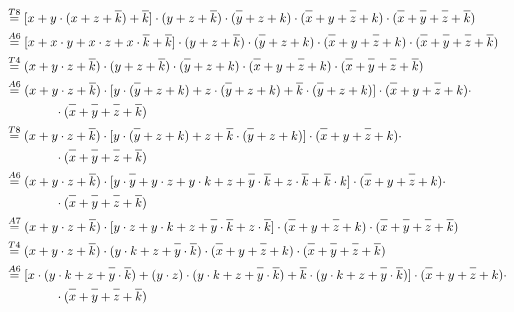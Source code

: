 \documentclass{article}
\newcommand*{\oline}[1]{\overline{#1\mathstrut}}
\newcommand{\bigspace}{\quad\quad\quad\quad}
\begin{document}
\begin{align*}
  &\overset{T8}{=} [x + y \cdot (x+z+\oline{k}) + \oline{k}] \cdot (y+z+\oline{k}) \cdot (\oline{y}+z+k) \cdot (\oline{x}+y+\oline{z}+k) \cdot (\oline{x}+\oline{y}+\oline{z}+\oline{k})\\
  &\overset{A6}{=} [x + x \cdot y + x \cdot z + x \cdot \oline{k} + \oline{k}] \cdot (y+z+\oline{k}) \cdot (\oline{y}+z+k) \cdot (\oline{x}+y+\oline{z}+k) \cdot (\oline{x}+\oline{y}+\oline{z}+\oline{k})\\
  &\overset{T4}{=} (x + y \cdot z + \oline{k}) \cdot (y+z+\oline{k}) \cdot (\oline{y}+z+k) \cdot (\oline{x}+y+\oline{z}+k) \cdot (\oline{x}+\oline{y}+\oline{z}+\oline{k})\\
  &\overset{A6}{=} (x + y \cdot z + \oline{k}) \cdot [y \cdot (\oline{y}+z+k) + z \cdot (\oline{y}+z+k) + \oline{k} \cdot (\oline{y}+z+k)] \cdot (\oline{x}+y+\oline{z}+k) \cdot\\
  &\bigspace \cdot (\oline{x}+\oline{y}+\oline{z}+\oline{k})\\
  &\overset{T8}{=} (x + y \cdot z + \oline{k}) \cdot [y \cdot (\oline{y}+z+k) + z + \oline{k} \cdot (\oline{y}+z+k)] \cdot (\oline{x}+y+\oline{z}+k) \cdot\\
  &\bigspace \cdot (\oline{x}+\oline{y}+\oline{z}+\oline{k})\\
  &\overset{A6}{=} (x + y \cdot z + \oline{k}) \cdot [y \cdot \oline{y} + y \cdot z + y \cdot k + z + \oline{y} \cdot \oline{k} + z \cdot \oline{k} + \oline{k} \cdot k] \cdot (\oline{x}+y+\oline{z}+k) \cdot\\
  &\bigspace \cdot (\oline{x}+\oline{y}+\oline{z}+\oline{k})\\
  &\overset{A7}{=} (x + y \cdot z + \oline{k}) \cdot [y \cdot z + y \cdot k + z + \oline{y} \cdot \oline{k} + z \cdot \oline{k}] \cdot (\oline{x}+y+\oline{z}+k) \cdot (\oline{x}+\oline{y}+\oline{z}+\oline{k})\\
  &\overset{T4}{=} (x + y \cdot z + \oline{k}) \cdot (y \cdot k + z + \oline{y} \cdot \oline{k}) \cdot (\oline{x}+y+\oline{z}+k) \cdot (\oline{x}+\oline{y}+\oline{z}+\oline{k})\\
  &\overset{A6}{=} [x \cdot (y \cdot k + z + \oline{y} \cdot \oline{k}) + (y \cdot z) \cdot (y \cdot k + z + \oline{y} \cdot \oline{k}) + \oline{k} \cdot (y \cdot k + z + \oline{y} \cdot \oline{k})] \cdot (\oline{x}+y+\oline{z}+k) \cdot\\
  &\bigspace \cdot (\oline{x}+\oline{y}+\oline{z}+\oline{k})\\

\end{align*}
\end{document}
